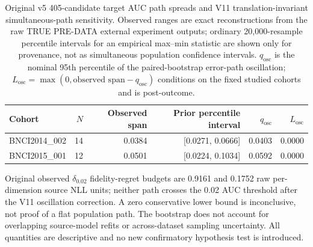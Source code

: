 \begin{table}[t]
\centering
\caption{Original v5 405-candidate target AUC path spreads and V11 translation-invariant simultaneous-path sensitivity. Observed ranges are exact reconstructions from the raw TRUE PRE-DATA external experiment outputs; ordinary 20,000-resample percentile intervals for an empirical max--min statistic are shown only for provenance, not as simultaneous population confidence intervals. \(q_{\mathrm{osc}}\) is the nominal 95th percentile of the paired-bootstrap error-path oscillation; \(L_{\mathrm{osc}}=\max(0,\text{observed span}-q_{\mathrm{osc}})\) conditions on the fixed studied cohorts and is post-outcome.}
\label{tab:validity-frontier}
\small
\begin{tabular}{lrrrrr}
\hline
Cohort & \(N\) & Observed span & Prior percentile interval & \(q_{\mathrm{osc}}\) & \(L_{\mathrm{osc}}\) \\
\hline
BNCI2014\_002 & 14 & 0.0384 & [0.0271, 0.0666] & 0.0403 & 0.0000 \\
BNCI2015\_001 & 12 & 0.0501 & [0.0224, 0.1034] & 0.0592 & 0.0000 \\
\hline
\end{tabular}

\vspace{1mm}
\footnotesize
Original observed \(\delta_{0.02}\) fidelity-regret budgets are 0.9161 and 0.1752 raw per-dimension source NLL units; neither path crosses the 0.02 AUC threshold after the V11 oscillation correction. A zero conservative lower bound is inconclusive, not proof of a flat population path. The bootstrap does not account for overlapping source-model refits or across-dataset sampling uncertainty. All quantities are descriptive and no new confirmatory hypothesis test is introduced.
\end{table}
